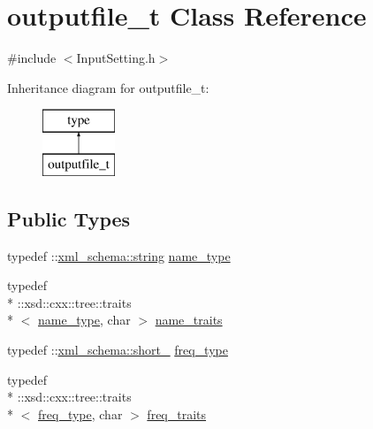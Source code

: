 \hypertarget{classoutputfile__t}{\section{outputfile\-\_\-t Class Reference}
\label{classoutputfile__t}
}


{\ttfamily \#include $<$Input\-Setting.\-h$>$}

Inheritance diagram for outputfile\-\_\-t\-:\begin{figure}[H]
\begin{center}
\leavevmode
\includegraphics[height=2.000000cm]{classoutputfile__t}
\end{center}
\end{figure}
\subsection*{Public Types}
\begin{DoxyCompactItemize}
\item 
typedef \-::\hyperlink{namespacexml__schema_ac0cec83a330f0024e4e318b3deac5104}{xml\-\_\-schema\-::string} \hyperlink{classoutputfile__t_a9207f2bca21ee3d91246fae00c13d24b}{name\-\_\-type}
\item 
typedef \\*
\-::xsd\-::cxx\-::tree\-::traits\\*
$<$ \hyperlink{classoutputfile__t_a9207f2bca21ee3d91246fae00c13d24b}{name\-\_\-type}, char $>$ \hyperlink{classoutputfile__t_a8282992129b5444c95e512f7c538c1c4}{name\-\_\-traits}
\item 
typedef \-::\hyperlink{namespacexml__schema_a705720c1fed1575ccdcfd21cb7ab39ab}{xml\-\_\-schema\-::short\-\_\-} \hyperlink{classoutputfile__t_a6a45c7bbd6bb78b02c32b155fdc19dda}{freq\-\_\-type}
\item 
typedef \\*
\-::xsd\-::cxx\-::tree\-::traits\\*
$<$ \hyperlink{classoutputfile__t_a6a45c7bbd6bb78b02c32b155fdc19dda}{freq\-\_\-type}, char $>$ \hyperlink{classoutputfile__t_a04c223dc2992caa7119ac006c8ebe6d7}{freq\-\_\-traits}
\end{DoxyCompactItemize}
